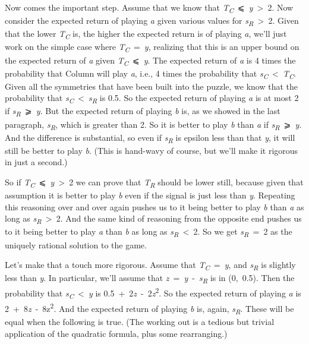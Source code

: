\documentclass[
  11pt,
  letterpaper,
  DIV=11,
  numbers=noendperiod,
  twoside]{scrartcl}
\begin{document}
Now comes the important step. Assume that we know that
\emph{T\textsubscript{C}}~⩽~\emph{y}~\textgreater~2. Now consider the
expected return of playing \emph{a} given various values for
\emph{s\textsubscript{R}}~\textgreater~2. Given that the lower
\emph{T\textsubscript{C}} is, the higher the expected return is of
playing \emph{a}, we'll just work on the simple case where
\emph{T\textsubscript{C}}~=~\emph{y}, realizing that this is an upper
bound on the expected return of \emph{a} given
\emph{T\textsubscript{C}}~⩽~\emph{y}. The expected return of \emph{a} is
4 times the probability that Column will play \emph{a}, i.e., 4 times
the probability that
\emph{s\textsubscript{C}}~\textless~\emph{T\textsubscript{C}}. Given all
the symmetries that have been built into the puzzle, we know that the
probability that
\emph{s\textsubscript{C}}~\textless~\emph{s\textsubscript{R}} is 0.5. So
the expected return of playing \emph{a} is at most 2 if
\emph{s\textsubscript{R}}~⩾~\emph{y}. But the expected return of playing
\emph{b} is, as we showed in the last paragraph,
\emph{s\textsubscript{R}}, which is greater than 2. So it is better to
play \emph{b} than \emph{a} if \emph{s\textsubscript{R}}~⩾~\emph{y}. And
the difference is substantial, so even if \emph{s\textsubscript{R}} is
epsilon less than that \emph{y}, it will still be better to play
\emph{b}. (This is hand-wavy of course, but we'll make it rigorous in
just a second.)

So if \emph{T\textsubscript{C}}~⩽~\emph{y}~\textgreater~2 we can prove
that \emph{T\textsubscript{R}} should be lower still, because given that
assumption it is better to play \emph{b} even if the signal is just less
than \emph{y}. Repeating this reasoning over and over again pushes us to
it being better to play \emph{b} than \emph{a} as long as
\emph{s\textsubscript{R}}~\textgreater~2. And the same kind of reasoning
from the opposite end pushes us to it being better to play \emph{a} than
\emph{b} as long as \emph{s\textsubscript{R}}~\textless~2. So we get
\emph{s\textsubscript{R}}~=~2 as the uniquely rational solution to the
game.

Let's make that a touch more rigorous. Assume that
\emph{T\textsubscript{C}}~=~\emph{y}, and \emph{s\textsubscript{R}} is
slightly less than \emph{y}. In particular, we'll assume that
\emph{z}~=~\emph{y}~-~\emph{s\textsubscript{R}} is in (0,~0.5). Then the
probability that \emph{s\textsubscript{C}}~\textless~\emph{y} is
0.5~+~2\emph{z}~-~2\emph{z}\textsuperscript{2}. So the expected return
of playing \emph{a} is 2~+~8\emph{z}~-~8z\textsuperscript{2}. And the
expected return of playing \emph{b} is, again,
\emph{s\textsubscript{R}}. These will be equal when the following is
true. (The working out is a tedious but trivial application of the
quadratic formula, plus some rearranging.)
\end{document}
